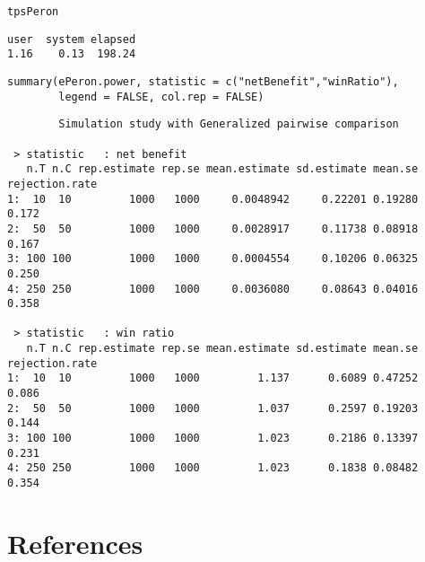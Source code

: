 \documentclass[12pt]{article}
\begin{document}
\lstset{language=r,label= ,caption= ,captionpos=b,numbers=none}
\begin{lstlisting}
tpsPeron
\end{lstlisting}

\begin{verbatim}
user  system elapsed 
1.16    0.13  198.24
\end{verbatim}

\lstset{language=r,label= ,caption= ,captionpos=b,numbers=none}
\begin{lstlisting}
summary(ePeron.power, statistic = c("netBenefit","winRatio"), 
		legend = FALSE, col.rep = FALSE)
\end{lstlisting}

\begin{verbatim}
        Simulation study with Generalized pairwise comparison

 > statistic   : net benefit
   n.T n.C rep.estimate rep.se mean.estimate sd.estimate mean.se rejection.rate
1:  10  10         1000   1000     0.0048942     0.22201 0.19280          0.172
2:  50  50         1000   1000     0.0028917     0.11738 0.08918          0.167
3: 100 100         1000   1000     0.0004554     0.10206 0.06325          0.250
4: 250 250         1000   1000     0.0036080     0.08643 0.04016          0.358

 > statistic   : win ratio
   n.T n.C rep.estimate rep.se mean.estimate sd.estimate mean.se rejection.rate
1:  10  10         1000   1000         1.137      0.6089 0.47252          0.086
2:  50  50         1000   1000         1.037      0.2597 0.19203          0.144
3: 100 100         1000   1000         1.023      0.2186 0.13397          0.231
4: 250 250         1000   1000         1.023      0.1838 0.08482          0.354
\end{verbatim}

\clearpage

\section{References}
\label{sec:orgbf35200}
\begingroup
\renewcommand{\section}[2]{}



\endgroup

\clearpage

\appendix
\end{document}
